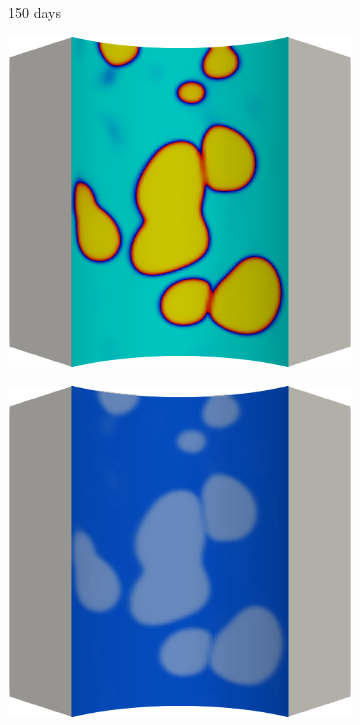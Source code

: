 \begin{figure}[!htbp]
  \begin{subfigure}{0.15\textwidth}
    \centering
    \caption*{150 days}
  \end{subfigure}
  \begin{subfigure}{0.19\textwidth}
    \centering
    \includegraphics[width=\textwidth]{Chapter5/figures/spallation/c.0015}
  \end{subfigure}
  \hspace{0.06\textwidth}
  \begin{subfigure}{0.19\textwidth}
    \centering
    \includegraphics[width=\textwidth]{Chapter5/figures/spallation/d.0015}

\end{subfigure}
\end{figure}
